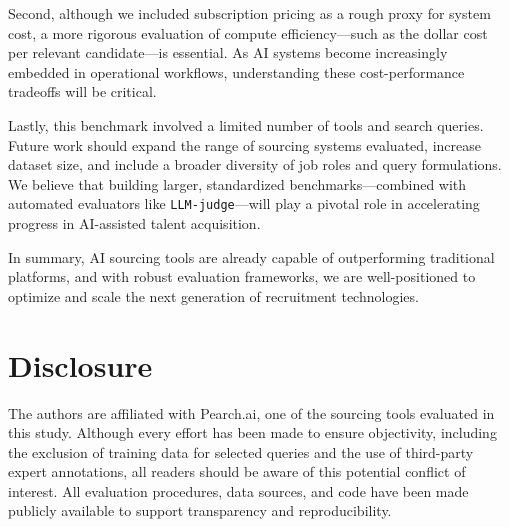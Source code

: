 \documentclass{article}
\begin{document}
Second, although we included subscription pricing as a rough proxy for system cost, a more rigorous evaluation of compute efficiency—such as the dollar cost per relevant candidate—is essential. As AI systems become increasingly embedded in operational workflows, understanding these cost-performance tradeoffs will be critical.

Lastly, this benchmark involved a limited number of tools and search queries. Future work should expand the range of sourcing systems evaluated, increase dataset size, and include a broader diversity of job roles and query formulations. We believe that building larger, standardized benchmarks—combined with automated evaluators like \texttt{LLM-judge}—will play a pivotal role in accelerating progress in AI-assisted talent acquisition.

In summary, AI sourcing tools are already capable of outperforming traditional platforms, and with robust evaluation frameworks, we are well-positioned to optimize and scale the next generation of recruitment technologies.
 

\section*{Disclosure}

The authors are affiliated with Pearch.ai, one of the sourcing tools evaluated in this study. Although every effort has been made to ensure objectivity, including the exclusion of training data for selected queries and the use of third-party expert annotations, all readers should be aware of this potential conflict of interest. All evaluation procedures, data sources, and code have been made publicly available to support transparency and reproducibility.




\end{document}
